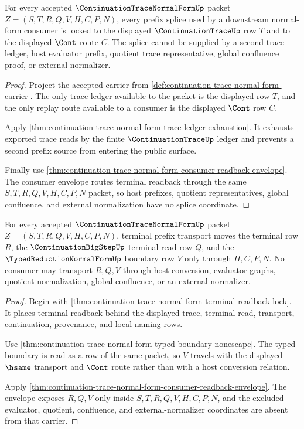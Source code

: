 \begin{theorem}
\label{thm:continuation-trace-normal-form-prefix-splice-lock}
For every accepted $\ContinuationTraceNormalFormUp$ packet $Z=(S,T,R,Q,V,H,C,P,N)$, every prefix splice used by a downstream normal-form consumer is locked to the displayed $\ContinuationTraceUp$ row $T$ and to the displayed $\Cont$ route $C$. The splice cannot be supplied by a second trace ledger, host evaluator prefix, quotient trace representative, global confluence proof, or external normalizer.
\end{theorem}
\begin{proof}
Project the accepted carrier from \autoref{def:continuation-trace-normal-form-carrier}. The only trace ledger available to the packet is the displayed row $T$, and the only replay route available to a consumer is the displayed $\Cont$ row $C$.

Apply \autoref{thm:continuation-trace-normal-form-trace-ledger-exhaustion}. It exhausts exported trace reads by the finite $\ContinuationTraceUp$ ledger and prevents a second prefix source from entering the public surface.

Finally use \autoref{thm:continuation-trace-normal-form-consumer-readback-envelope}. The consumer envelope routes terminal readback through the same $S,T,R,Q,V,H,C,P,N$ packet, so host prefixes, quotient representatives, global confluence, and external normalization have no splice coordinate.
\end{proof}

\begin{theorem}
\label{thm:continuation-trace-normal-form-terminal-prefix-transport}
For every accepted $\ContinuationTraceNormalFormUp$ packet $Z=(S,T,R,Q,V,H,C,P,N)$, terminal prefix transport moves the terminal row $R$, the $\ContinuationBigStepUp$ terminal-read row $Q$, and the $\TypedReductionNormalFormUp$ boundary row $V$ only through $H,C,P,N$. No consumer may transport $R,Q,V$ through host conversion, evaluator graphs, quotient normalization, global confluence, or an external normalizer.
\end{theorem}
\begin{proof}
Begin with \autoref{thm:continuation-trace-normal-form-terminal-readback-lock}. It places terminal readback behind the displayed trace, terminal-read, transport, continuation, provenance, and local naming rows.

Use \autoref{thm:continuation-trace-normal-form-typed-boundary-nonescape}. The typed boundary is read as a row of the same packet, so $V$ travels with the displayed $\hsame$ transport and $\Cont$ route rather than with a host conversion relation.

Apply \autoref{thm:continuation-trace-normal-form-consumer-readback-envelope}. The envelope exposes $R,Q,V$ only inside $S,T,R,Q,V,H,C,P,N$, and the excluded evaluator, quotient, confluence, and external-normalizer coordinates are absent from that carrier.
\end{proof}

